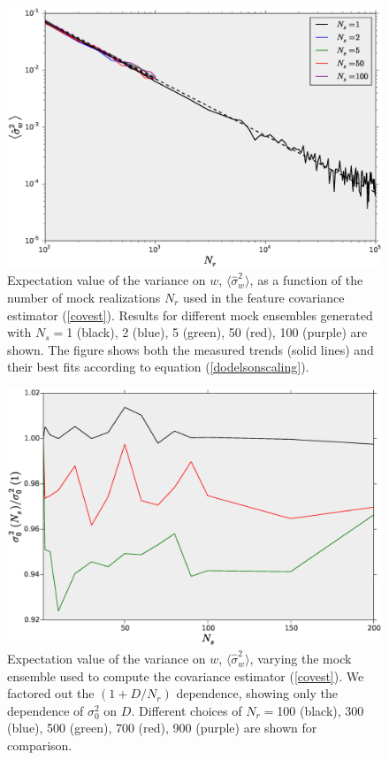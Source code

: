 \documentclass[reprint,aps,prd,superscriptaddress,showkeys,showpacs]{revtex4-1}
\newcommand{\h}[1]{\hat{#1}}
\begin{document}
\begin{figure}
\includegraphics[scale=0.3]{Figures/scaling_nr.eps}
\caption{Expectation value of the variance on $w$, $\langle\h{\sigma}^2_w\rangle$, as a function of the number of mock realizations $N_r$ used in the feature covariance estimator (\ref{covest}). Results for different mock ensembles generated with $N_s=$1 (black), 2 (blue), 5 (green), 50 (red), 100 (purple) are shown. The figure shows both the measured trends (solid lines) and their best fits according to equation (\ref{dodelsonscaling}). }
\label{wvar_nr}
\end{figure}

\begin{figure}
\includegraphics[scale=0.3]{Figures/scaling_ns.eps}
\caption{Expectation value of the variance on $w$, $\langle\h{\sigma}^2_w\rangle$, varying the mock ensemble used to compute the covariance estimator (\ref{covest}). We factored out the $(1+D/N_r)$ dependence, showing only the dependence of $\sigma_0^2$ on $D$. Different choices of $N_r=$100 (black), 300 (blue), 500 (green), 700 (red), 900 (purple) are shown for comparison.}
\label{wvar_ns}
\end{figure}
\end{document}
